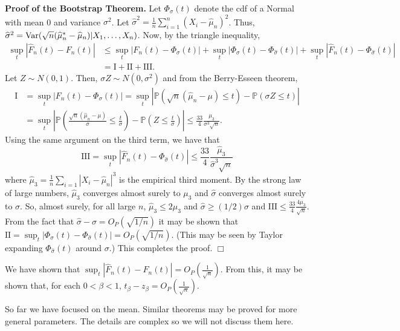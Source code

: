 \documentclass[twoside,12pt]{article}
\begin{document}
{\bf Proof of the Bootstrap Theorem.}
Let $\Phi_\sigma(t)$ denote the cdf of a Normal with mean 0
and variance $\sigma^2$.
Let $\widehat\sigma^2 = \frac{1}{n}\sum_{i=1}^n (X_i - \widehat\mu_n)^2$.
Thus,
$\widehat\sigma^2 = {\rm Var}( \sqrt{n}(\widehat\mu_n^* - \widehat\mu_n)|X_1,\ldots, X_n)$.
Now, by the triangle inequality,
\begin{align*}
\sup_t | \widehat F_n(t) - F_n(t)| & \leq
\sup_t | F_n(t) - \Phi_\sigma(t)| +
 \sup_t | \Phi_\sigma(t) - \Phi_{\widehat\sigma}(t)| + 
\sup_t | \widehat F_n(t) - \Phi_{\widehat\sigma}(t)| \\
& =
\mbox{I} + \mbox{II} + \mbox{III}.
\end{align*}
Let $Z\sim N(0,1)$.
Then, 
$\sigma Z \sim N(0,\sigma^2)$ and
from the Berry-Esseen theorem,
\begin{align*}
\mbox{I} &= \sup_t | F_n(t) - \Phi_\sigma(t)| =
\sup_t \left|\mathbb{P}\left(\sqrt{n}(\widehat\mu_n - \mu)\leq t\right) - \mathbb{P}\left(\sigma Z \leq t\right)\right|\\
&=
\sup_t \left|\mathbb{P}\left(\frac{\sqrt{n}(\widehat\mu_n - \mu)}{\sigma}\leq \frac{t}{\sigma}\right) - 
\mathbb{P}\left( Z \leq \frac{t}{\sigma}\right)\right| \leq
\frac{33}{4} \frac{\mu_3}{\sigma^3\sqrt{n}}.
\end{align*}
Using the same argument on the third term, we have that
$$
\mbox{III}=\sup_t | \widehat F_n(t) - \Phi_{\widehat\sigma}(t)| \leq
\frac{33}{4} \frac{\widehat\mu_3}{\widehat\sigma^3\sqrt{n}}
$$
where
$\widehat\mu_3 = \frac{1}{n}\sum_{i=1} |X_i-\widehat\mu_n|^3$
is the empirical third moment.
By the strong law of large numbers,
$\widehat\mu_3$ converges almost surely to $\mu_3$ and
$\widehat\sigma$ converges almost surely to $\sigma$.
So, almost surely, for all large $n$,
$\widehat\mu_3 \leq 2 \mu_3$ and
$\widehat\sigma \geq (1/2) \sigma$ and
$\mbox{III} \leq \frac{33}{4} \frac{4\mu_3}{\sqrt{n}}.$
From the fact that
$\widehat\sigma - \sigma = O_P(\sqrt{1/n})$
it may be shown that
$\mbox{II} =\sup_t | \Phi_\sigma(t) - \Phi_{\widehat\sigma}(t)| =O_P(\sqrt{1/n})$.
(This may be seen by Taylor expanding
$\Phi_{\widehat\sigma}(t)$ around $\sigma$.)
This completes the proof.
$\Box$

We have shown that
$\sup_t | \widehat F_n(t) - F_n(t)| = O_P\left(\frac{1}{\sqrt{n}}\right).$
From this, it may be shown that, for each $0 < \beta < 1$,
$t_{\beta}- z_{\beta}= O_P\left(\frac{1}{\sqrt{n}}\right).$

So far we have focused on the mean.
Similar theorems may be proved for more general
parameters.
The details are complex so we will not
discuss them here.
\end{document}
